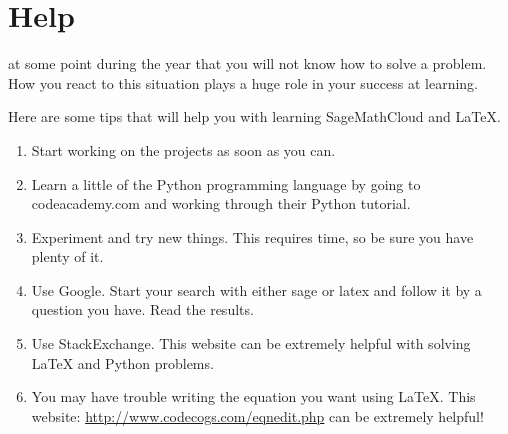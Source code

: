 \documentclass
[justified,nohyper]
{tufte-handout}
\begin{document}
\section{Help}

 at some point during the year that you will not know how to solve a problem. How you react to this situation plays a huge role in your success at learning.

Here are some tips that will help you with learning SageMathCloud and \LaTeX.

\begin{enumerate}
  \item Start working on the projects as soon as you can.
  \item Learn a little of the Python programming language by going to codeacademy.com and working through their Python tutorial.
  \item Experiment and try new things. This requires time, so be sure you have plenty of it.
  \item Use Google. Start your search with either sage or latex and follow it by a question you have. Read the results.
  \item Use StackExchange. This website can be extremely helpful with solving \LaTeX\; and Python problems.
  \item You may have trouble writing the equation you want using \LaTeX\;. This website: \url{http://www.codecogs.com/eqnedit.php} can be extremely helpful!
\end{enumerate}
\end{document}
